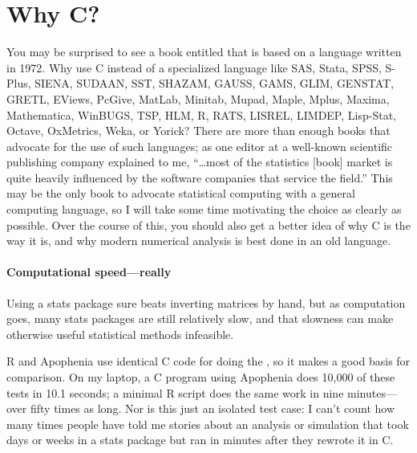 \section{Why C?}
You may be surprised to see a book entitled  that is based on a language written in 1972. 
Why use C instead of a specialized language like SAS, Stata, SPSS,
S-Plus, SIENA, SUDAAN, SST, SHAZAM, GAUSS, GAMS, GLIM, GENSTAT, GRETL, EViews,
PcGive, MatLab, Minitab, Mupad, Maple, Mplus, Maxima, Mathematica, WinBUGS, TSP,
HLM, R, RATS, LISREL, LIMDEP, Lisp-Stat, Octave, OxMetrics, Weka, or Yorick?
There are more than enough books that advocate for the use of such
languages; as one editor at a well-known scientific publishing company
explained to me, ``\dots most of the statistics [book] market is quite
heavily influenced by the software companies that service the field.''
This may be the only book to advocate statistical computing with
a general computing language, so I will take some time motivating the
choice as clearly as possible. Over the course of this, you should also
get a better idea of why C is the way it is, and why modern numerical
analysis
is best done in an old language.

\paragraph{Computational speed---really} Using a stats package sure
beats inverting matrices by hand, but as computation goes, many stats
packages are still relatively slow, and that slowness can make otherwise
useful statistical methods infeasible.

R and Apophenia use identical C code for doing the , so it makes a good basis for comparison. On my laptop,
a C program using Apophenia does 10,000 of these tests in 10.1 seconds;
a minimal R script does the same work in nine minutes---over fifty times
as long. Nor is this just an isolated test case: I can't count how many
times people have told me stories about an analysis or simulation that
took days or weeks in a stats package but ran in minutes after they
rewrote it in C.

